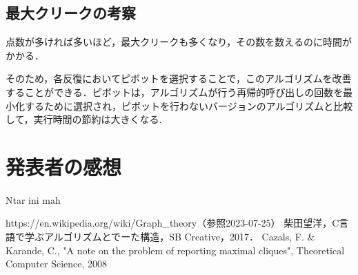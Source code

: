 \documentclass[a4j, titlepage]{jarticle}
\begin{document}
    \subsection{最大クリークの考察}
    点数が多ければ多いほど，最大クリークも多くなり，その数を数えるのに時間がかかる．
    
    そのため，各反復においてピボットを選択することで，このアルゴリズムを改善することができる．ピボットは，アルゴリズムが行う再帰的呼び出しの回数を最小化するために選択され，ピボットを行わないバージョンのアルゴリズムと比較して，実行時間の節約は大きくなる\cite{bib:cazals}. %

\section{発表者の感想}
    Ntar ini mah

    \begin{thebibliography}{99}
        https://en.wikipedia.org/wiki/Graph\_theory（参照2023-07-25）
        柴田望洋，C言語で学ぶアルゴリズムとでーた構造，SB Creative，2017．
        Cazals, F. \& Karande, C., "A note on the problem of reporting maximal cliques", Theoretical Computer Science, 2008
      \end{thebibliography}
    
\end{document}
